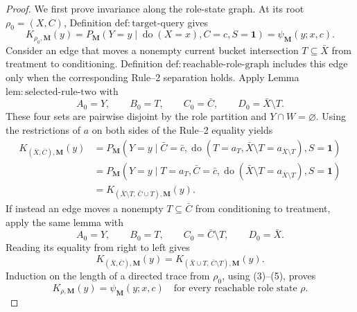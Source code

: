 \documentclass{article}
\begin{document}
\begin{proof}
We first prove invariance along the role-state graph.  At its root \(\rho_0=(X,C)\), Definition \(\mathrm{def{:}target\text{-}query}\) gives
\[
 K_{\rho_0,\mathbf M}(y)
 =P_{\mathbf M}(Y=y\mid\operatorname{do}(X=x),C=c,S=\mathbf 1)
 =\psi_{\mathbf M}(y;x,c).
 \tag{3}
\]
Consider an edge that moves a nonempty current bucket intersection \(T\subseteq\bar X\) from treatment to conditioning.  Definition \(\mathrm{def{:}reachable\text{-}role\text{-}graph}\) includes this edge only when the corresponding Rule--2 separation holds.  Apply Lemma \(\mathrm{lem{:}selected\text{-}rule\text{-}two}\) with
\[
 A_0=Y,\qquad B_0=T,\qquad C_0=\bar C,
 \qquad D_0=\bar X\setminus T.
\]
These four sets are pairwise disjoint by the role partition and \(Y\cap W=\varnothing\).  Using the restrictions of \(a\) on both sides of the Rule--2 equality yields
\[
\begin{aligned}
 K_{(\bar X,\bar C),\mathbf M}(y)
 &=P_{\mathbf M}\!\left(
 Y=y\mid \bar C=\bar c,
 \operatorname{do}(T=a_T,\bar X\setminus T=a_{\bar X\setminus T}),
 S=\mathbf 1\right)\\
 &=P_{\mathbf M}\!\left(
 Y=y\mid T=a_T,\bar C=\bar c,
 \operatorname{do}(\bar X\setminus T=a_{\bar X\setminus T}),
 S=\mathbf 1\right)\\
 &=K_{(\bar X\setminus T,\,\bar C\cup T),\mathbf M}(y).
\end{aligned}
\tag{4}
\]
If instead an edge moves a nonempty \(T\subseteq\bar C\) from conditioning to treatment, apply the same lemma with
\[
 A_0=Y,\qquad B_0=T,\qquad C_0=\bar C\setminus T,
 \qquad D_0=\bar X.
\]
Reading its equality from right to left gives
\[
 K_{(\bar X,\bar C),\mathbf M}(y)
 =K_{(\bar X\cup T,\,\bar C\setminus T),\mathbf M}(y).
 \tag{5}
\]
Induction on the length of a directed trace from \(\rho_0\), using (3)--(5), proves
\[
 K_{\rho,\mathbf M}(y)=\psi_{\mathbf M}(y;x,c)
 \quad\text{for every reachable role state }\rho.
 \tag{6}
\]


\end{proof}
\end{document}
